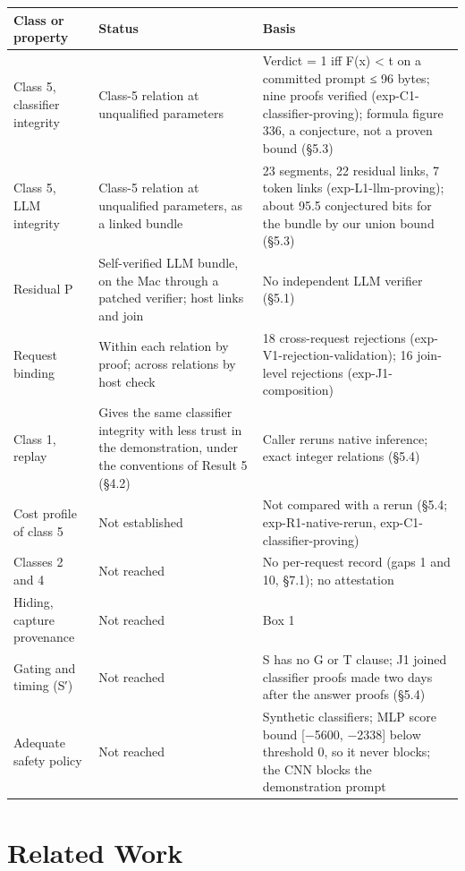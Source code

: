 \documentclass[11pt]{article}
\begin{document}
{\small
\begin{xltabular}{\linewidth}{XXX}
\toprule
\textbf{Class or property} & \textbf{Status} & \textbf{Basis} \\ \midrule
\endhead
Class 5, classifier integrity & Class-5 relation at unqualified parameters & Verdict = 1 iff F(x) < t on a committed prompt ≤ 96 bytes; nine proofs verified (exp-C1-classifier-proving); formula figure 336, a conjecture, not a proven bound (\S{}5.3) \\
Class 5, LLM integrity & Class-5 relation at unqualified parameters, as a linked bundle & 23 segments, 22 residual links, 7 token links (exp-L1-llm-proving); about 95.5 conjectured bits for the bundle by our union bound (\S{}5.3) \\
Residual P & Self-verified LLM bundle, on the Mac through a patched verifier; host links and join & No independent LLM verifier (\S{}5.1) \\
Request binding & Within each relation by proof; across relations by host check & 18 cross-request rejections (exp-V1-rejection-validation); 16 join-level rejections (exp-J1-composition) \\
Class 1, replay & Gives the same classifier integrity with less trust in the demonstration, under the conventions of Result 5 (\S{}4.2) & Caller reruns native inference; exact integer relations (\S{}5.4) \\
Cost profile of class 5 & Not established & Not compared with a rerun (\S{}5.4; exp-R1-native-rerun, exp-C1-classifier-proving) \\
Classes 2 and 4 & Not reached & No per-request record (gaps 1 and 10, \S{}7.1); no attestation \\
Hiding, capture provenance & Not reached & Box 1 \\
Gating and timing (S′) & Not reached & S has no G or T clause; J1 joined classifier proofs made two days after the answer proofs (\S{}5.4) \\
Adequate safety policy & Not reached & Synthetic classifiers; MLP score bound [−5600, −2338] below threshold 0, so it never blocks; the CNN blocks the demonstration prompt \\
\bottomrule
\end{xltabular}}

\section{Related Work}
\end{document}
